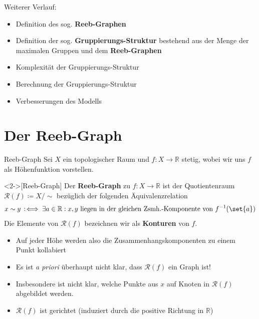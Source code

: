 \documentclass[
wide,
10pt,
xcolor={x11names,svgnames},
hyperref={pdfauthor={Jannes Bantje},colorlinks,urlcolor=maincolor,hidelinks=false,linkcolor=maincolor},
pantone312, 	%
euler-digits,
]{beamer}
\DeclareRobustCommand{\GrpStruktur}{Gruppierungs-Struktur\xspace}
\newcommand{\Index}[1]{\bet{#1}}
\newcommand{\bet}[1]{\textbf{\color{maincolor}#1}}
\theoremstyle{definition}
\begin{document}
\begin{frame}
    Weiterer Verlauf:
    \begin{itemize}[<+->]
        \item Definition des sog. \bet{Reeb-Graphen}
        \item Definition der sog. \bet{\GrpStruktur} bestehend aus der Menge der maximalen Gruppen und dem \bet{Reeb-Graphen}
        \item Komplexität der \GrpStruktur
        \item Berechnung der \GrpStruktur
        \item Verbesserungen des Modells
    \end{itemize}
\end{frame}

\section{Der Reeb-Graph}

\begin{frame}{Reeb-Graph}
    Sei $X$ ein topologischer Raum und $f \colon X \to \mathbb{R}$ stetig, wobei wir uns $f$ als Höhenfunktion vorstellen.
    \begin{definition}<2->[Reeb-Graph]
    	Der \bet{Reeb-Graph} zu $f \colon X \to \mathbb{R}$ ist der Quotientenraum $\mathcal{R}(f) \coloneqq X/{\sim}$ bezüglich der folgenden Äquivalenzrelation
    	\[
    		x \sim y \,:\mkern-3mu\iff \exists a \in \mathbb{R} : x,y \text{ liegen in der gleichen Zsmh.-Komponente von } f^{-1}(\set{a})
    	\]
    	Die Elemente von $\mathcal{R}(f)$ bezeichnen wir als \Index{Konturen} von $f$.
    \end{definition}
    \begin{itemize}
        \item<3-> Auf jeder Höhe werden also die Zusammenhangskomponenten zu einem Punkt kollabiert
        \item<4-> Es ist \emph{a priori} überhaupt nicht klar, dass $\mathcal{R}(f)$ ein Graph ist!
        \item<5-> Insbesondere ist nicht klar, welche Punkte aus $x$ auf Knoten in $\mathcal{R}(f)$ abgebildet werden.
        \item<6-> $\mathcal{R}(f)$ ist gerichtet (induziert durch die positive Richtung in $\mathbb{R}$)
    \end{itemize}
\end{frame}
\end{document}
